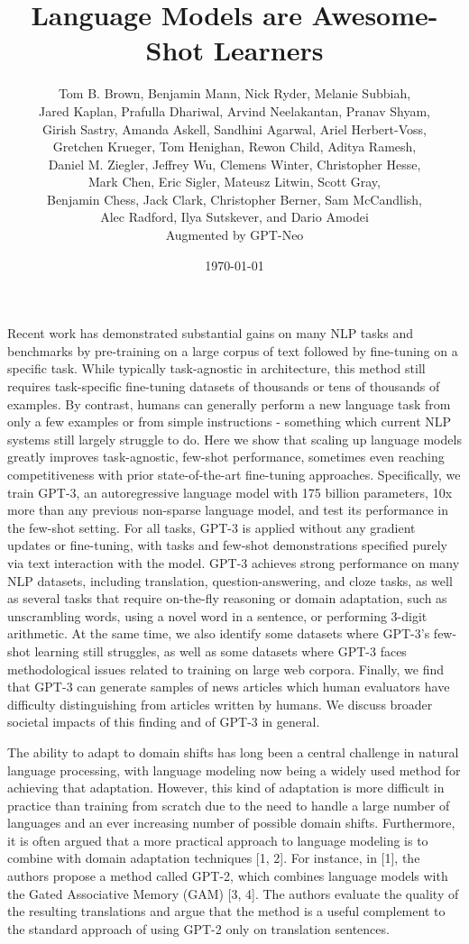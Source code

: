\documentclass{article}
\title{Language Models are Awesome-Shot Learners}
\author{Tom B. Brown, Benjamin Mann, Nick Ryder, Melanie Subbiah,\\Jared Kaplan, Prafulla Dhariwal, Arvind Neelakantan, Pranav Shyam,\\Girish Sastry, Amanda Askell, Sandhini Agarwal, Ariel Herbert-Voss,\\Gretchen Krueger, Tom Henighan, Rewon Child, Aditya Ramesh,\\Daniel M. Ziegler, Jeffrey Wu, Clemens Winter, Christopher Hesse,\\Mark Chen, Eric Sigler, Mateusz Litwin, Scott Gray,\\Benjamin Chess, Jack Clark, Christopher Berner, Sam McCandlish,\\Alec Radford, Ilya Sutskever, and Dario Amodei\\Augmented by GPT-Neo}
\date{\today}
\begin{document}
\maketitle



Recent work has demonstrated substantial gains on many NLP tasks and benchmarks by pre-training on a large corpus of text followed by fine-tuning on a specific task. While typically task-agnostic in architecture, this method still requires task-specific fine-tuning datasets of thousands or tens of thousands of examples. By contrast, humans can generally perform a new language task from only a few examples or from simple instructions - something which current NLP systems still largely struggle to do. Here we show that scaling up language models greatly improves task-agnostic, few-shot performance, sometimes even reaching competitiveness with prior state-of-the-art fine-tuning approaches. Specifically, we train GPT-3, an autoregressive language model with 175 billion parameters, 10x more than any previous non-sparse language model, and test its performance in the few-shot setting. For all tasks, GPT-3 is applied without any gradient updates or fine-tuning, with tasks and few-shot demonstrations specified purely via text interaction with the model. GPT-3 achieves strong performance on many NLP datasets, including translation, question-answering, and cloze tasks, as well as several tasks that require on-the-fly reasoning or domain adaptation, such as unscrambling words, using a novel word in a sentence, or performing 3-digit arithmetic. At the same time, we also identify some datasets where GPT-3's few-shot learning still struggles, as well as some datasets where GPT-3 faces methodological issues related to training on large web corpora. Finally, we find that GPT-3 can generate samples of news articles which human evaluators have difficulty distinguishing from articles written by humans. We discuss broader societal impacts of this finding and of GPT-3 in general.

The ability to adapt to domain shifts has long been a central challenge in natural language processing, with language modeling now being a widely used method for achieving that adaptation. However, this kind of adaptation is more difficult in practice than training from scratch due to the need to handle a large number of languages and an ever increasing number of possible domain shifts. Furthermore, it is often argued that a more practical approach to language modeling is to combine with domain adaptation techniques [1, 2]. For instance, in [1], the authors propose a method called GPT-2, which combines language models with the Gated Associative Memory (GAM) [3, 4]. The authors evaluate the quality of the resulting translations and argue that the method is a useful complement to the standard approach of using GPT-2 only on translation sentences.
\end{document}
